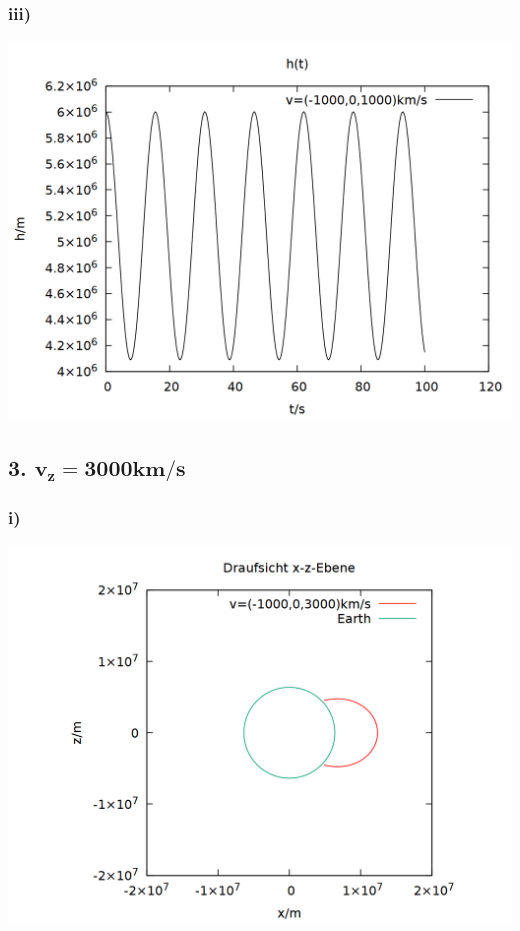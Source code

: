 \documentclass{scrreprt}
\begin{document}
\subsubsection*{iii)}
\begin{center}
\includegraphics[scale=0.25]{plot_2_iii.png}
\end{center}

\subsection*{3. $\mathbf{v_z = 3000km/s}$}
\subsubsection*{i)}
\begin{center}
\includegraphics[scale=0.25]{plot_3_i.png}
\end{center}
\end{document}
